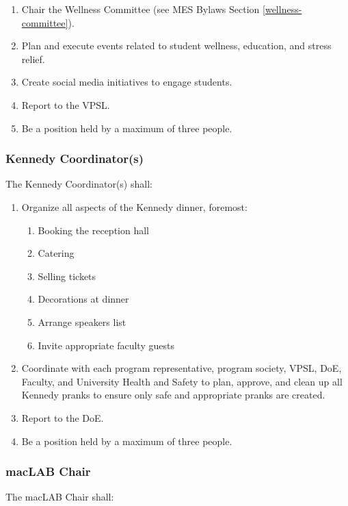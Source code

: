 \begin{enumerate}
 \item
  Chair the Wellness Committee (see MES Bylaws Section \ref{wellness-committee}).
 \item
  Plan and execute events related to student wellness, education, and stress relief.
 \item
  Create social media initiatives to engage students.
 \item
  Report to the VPSL.
 \item
  Be a position held by a maximum of three people.

\end{enumerate}

\subsubsection{Kennedy Coordinator(s)}
\label{kennedy-coordinators}
The Kennedy Coordinator(s) shall:

\begin{enumerate}
 \item
  Organize all aspects of the Kennedy dinner, foremost:

  \begin{enumerate}
   \item
    Booking the reception hall
   \item
    Catering
   \item
    Selling tickets
   \item
    Decorations at dinner
   \item
    Arrange speakers list
   \item
    Invite appropriate faculty guests
  \end{enumerate}
 \item
  Coordinate with each program representative, program society, VPSL, DoE, Faculty, and University Health and Safety to plan, approve, and clean up all Kennedy pranks to ensure only safe and appropriate pranks are created.
 \item
  Report to the DoE.
 \item
  Be a position held by a maximum of three people.

\end{enumerate}
\subsubsection{macLAB Chair}
\label{maclab-chair}

The macLAB Chair shall:

